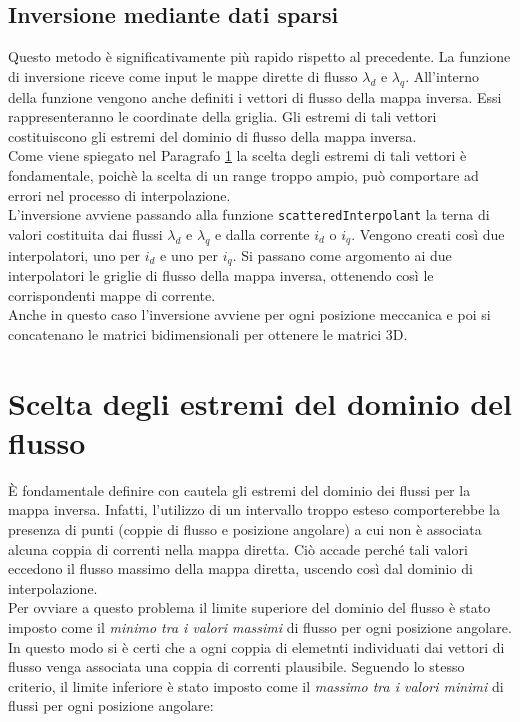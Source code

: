 \subsection{Inversione mediante dati sparsi}
Questo metodo è significativamente più rapido rispetto al precedente. La funzione di inversione riceve come input le mappe dirette di flusso $\lambda_d$ e $\lambda_q$. All'interno della funzione vengono anche definiti i vettori di flusso della mappa inversa. Essi rappresenteranno le coordinate della griglia. Gli estremi di tali vettori costituiscono gli estremi del dominio di flusso della mappa inversa.\\ Come viene spiegato nel Paragrafo \ref{sec:limiti_dominio_flusso} la scelta degli estremi di tali vettori è fondamentale, poichè la scelta di un range troppo ampio, può comportare ad errori nel processo di interpolazione.\\ L'inversione avviene passando alla funzione  \texttt{scatteredInterpolant} la terna di valori costituita dai flussi $\lambda_d$ e $\lambda_q$ e dalla corrente $i_d$ o $i_q$. Vengono creati così due  interpolatori, uno per $i_d$ e uno per $i_q$. Si passano come argomento ai due interpolatori le griglie di flusso della mappa inversa, ottenendo così le corrispondenti mappe di corrente.\\
Anche in questo caso l'inversione avviene per ogni posizione meccanica e poi si concatenano le matrici bidimensionali per ottenere le matrici 3D.

\section{Scelta degli estremi del dominio del flusso}
\label{sec:limiti_dominio_flusso}
È fondamentale definire con cautela gli estremi del dominio dei flussi per la mappa inversa. Infatti, l'utilizzo di un intervallo troppo esteso comporterebbe la presenza di punti (coppie di flusso e posizione angolare) a cui non è associata alcuna coppia di correnti nella mappa diretta. Ciò accade perché tali valori eccedono il flusso massimo della mappa diretta, uscendo così dal dominio di interpolazione.\\
Per ovviare a questo problema il limite superiore del dominio del flusso è stato imposto come il \textit{minimo tra i valori massimi} di flusso per ogni posizione angolare. In questo modo si è certi che a ogni coppia di elemetnti individuati dai vettori di flusso venga  associata una coppia di correnti plausibile. Seguendo lo stesso criterio, il limite inferiore  è stato imposto come il \textit{massimo tra i valori minimi} di flussi per ogni posizione angolare:



